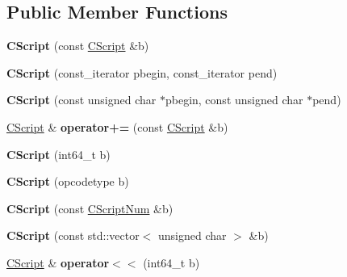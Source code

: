 \subsection*{Public Member Functions}
\begin{DoxyCompactItemize}
\item 
\mbox{\label{class_c_script_a32037617a2648c826f3685d17a46d6cf}} 
{\bfseries C\+Script} (const \mbox{\hyperlink{class_c_script}{C\+Script}} \&b)
\item 
\mbox{\label{class_c_script_a06a47661695214630a2f41d4019b20f5}} 
{\bfseries C\+Script} (const\+\_\+iterator pbegin, const\+\_\+iterator pend)
\item 
\mbox{\label{class_c_script_aa8d9ad6ecd9662b423b73294783396ce}} 
{\bfseries C\+Script} (const unsigned char $\ast$pbegin, const unsigned char $\ast$pend)
\item 
\mbox{\label{class_c_script_af5c72a9c725a2c4f1432cc214d54cfd7}} 
\mbox{\hyperlink{class_c_script}{C\+Script}} \& {\bfseries operator+=} (const \mbox{\hyperlink{class_c_script}{C\+Script}} \&b)
\item 
\mbox{\label{class_c_script_a48cc35ec0c9119def402a7118e81cf00}} 
{\bfseries C\+Script} (int64\+\_\+t b)
\item 
\mbox{\label{class_c_script_a8214376dea81245d33a44a2ea7c2cdc3}} 
{\bfseries C\+Script} (opcodetype b)
\item 
\mbox{\label{class_c_script_a360223feeb0931931b8e8a5288dc4bd5}} 
{\bfseries C\+Script} (const \mbox{\hyperlink{class_c_script_num}{C\+Script\+Num}} \&b)
\item 
\mbox{\label{class_c_script_ab2348dd32f252c468f793ec290924603}} 
{\bfseries C\+Script} (const std\+::vector$<$ unsigned char $>$ \&b)
\item 
\mbox{\label{class_c_script_aafde904eee737599e8b4f98c4a9d1043}} 
\mbox{\hyperlink{class_c_script}{C\+Script}} \& {\bfseries operator$<$$<$} (int64\+\_\+t b)
\item 
\mbox{\label{class_c_script_af22201e1171b6390b4a06678d00c78d3}} 

\end{DoxyCompactItemize}
